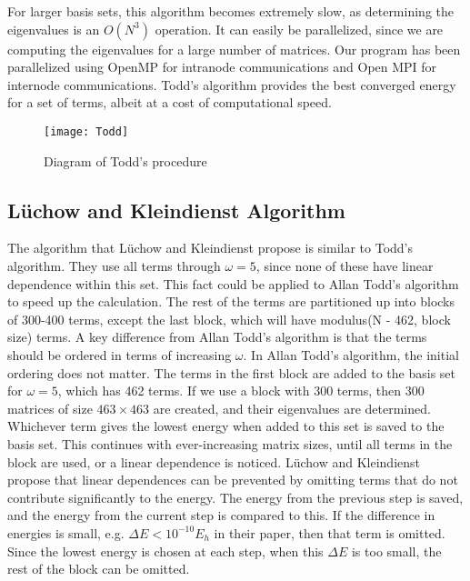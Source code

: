 \documentclass[Dissertation.tex]{subfiles}
\begin{document}
For larger basis sets, this algorithm becomes extremely slow, as determining 
the eigenvalues is an $O(N^3)$ operation. It can easily be parallelized, 
since we are computing the eigenvalues for a large number of matrices. Our 
program has been parallelized using OpenMP for intranode communications and 
Open MPI for internode communications. Todd's algorithm provides the best 
converged energy for a set of terms, albeit at a cost of computational speed.

\begin{figure}[H]
	\centering
	{\texttt{[image: Todd]}}
	\caption{Diagram of Todd's procedure}
	\label{fig:Todd}
\end{figure}


\subsection{L\"uchow and Kleindienst Algorithm} \label{sec:LuchowBound}
The algorithm that L\"uchow and Kleindienst propose \cite{Luchow1992} is 
similar to Todd's algorithm. They use all terms through $\omega = 5$, since 
none of these have linear dependence within this set. This fact could be 
applied to Allan Todd's algorithm to speed up the calculation. The rest of 
the terms are partitioned up into blocks of 300-400 terms, except the last 
block, which will have modulus(N - 462, block size) terms. A key difference 
from Allan Todd's algorithm is that the terms should be ordered in terms of 
increasing $\omega$. In Allan Todd's algorithm, the initial ordering does not 
matter. The terms in the first block are added to the basis set for
$\omega = 5$, which has 462 terms. If we use a block with 300 terms, then 300 matrices 
of size $463 \times 463$ are created, and their eigenvalues are determined. Whichever 
term gives the lowest energy when added to this set is saved to the basis 
set. This continues with ever-increasing matrix sizes, until all terms in the 
block are used, or a linear dependence is noticed. L\"uchow and Kleindienst 
propose that linear dependences can be prevented by omitting terms that do 
not contribute significantly to the energy. The energy from the previous step 
is saved, and the energy from the current step is compared to this. If the 
difference in energies is small, e.g. $\Delta E < 10^{-10} E_h$ in their 
paper, then that term is omitted. Since the lowest energy is chosen at each 
step, when this $\Delta E$ is too small, the rest of the block can be omitted.
\end{document}
